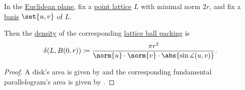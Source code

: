 \begin{proposition}\label{thm:disk_packing_density}
  In the \hyperref[def:euclidean_plane]{Euclidean plane}, fix a \hyperref[def:point_lattice]{point lattice} \( L \) with minimal norm \( 2r \), and fix a \hyperref[def:point_lattice_basis]{basis} \( \set{ u, v } \) of \( L \).

  Then the \hyperref[def:lattice_packing_density]{density} of the corresponding \hyperref[def:lattice_ball_packing]{lattice ball packing} is
  \begin{equation}\label{eq:def:disk_packing_density}
    \delta(L, B(0, r)) \coloneqq \frac {\pi r^2} {\norm{u} \cdot \norm{v} \cdot \abs{\sin\measuredangle(u, v)}}.
  \end{equation}
\end{proposition}
\begin{proof}
  A disk's area is given by  and the corresponding fundamental parallelogram's area is given by .
\end{proof}

